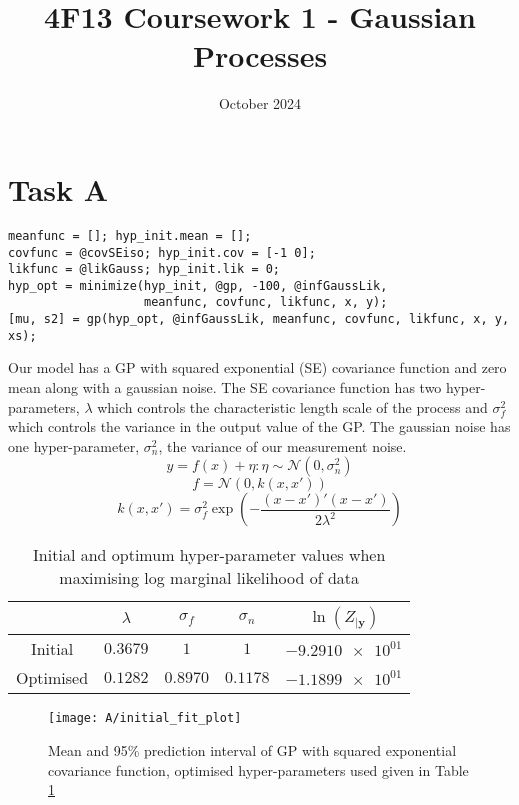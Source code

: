 \documentclass[11pt]{article}
\title{\vspace{-2cm}4F13 Coursework 1 - Gaussian Processes}
\author{}
\date{October 2024}
\begin{document}
\maketitle
\section{Task A}

\begin{lstlisting}[caption=Code to train hyper-parameters and generate the predictive distribution of a GP with squared exponential covariance, captionpos=b, basicstyle=\small]
meanfunc = []; hyp_init.mean = [];
covfunc = @covSEiso; hyp_init.cov = [-1 0];
likfunc = @likGauss; hyp_init.lik = 0;
hyp_opt = minimize(hyp_init, @gp, -100, @infGaussLik, 
                   meanfunc, covfunc, likfunc, x, y);
[mu, s2] = gp(hyp_opt, @infGaussLik, meanfunc, covfunc, likfunc, x, y, xs);
\end{lstlisting}
\label{lst:A}

Our model has a GP with squared exponential (SE) covariance function and zero mean along with a gaussian noise. The SE covariance function has two hyper-parameters, $\lambda$ which controls the characteristic length scale of the process and $\sigma_f^2$ which controls the variance in the output value of the GP. The gaussian noise has one hyper-parameter, $\sigma_n^2$, the variance of our measurement noise. 
\[y = f(x) + \eta : \eta \sim \mathcal{N}(0, \sigma_n^2)\]
\[f = \mathcal{N}(0, k(x, x'))\]
\[k(x,x') = \sigma_f^2 \exp(-\frac{(x-x')'(x-x')}{2\lambda^2})\]

\begin{table}[h]
    \centering
    \begin{tabular}{|c|c|c|c|c|}
        \hline
         & $\lambda$ & $\sigma_f$ & $\sigma_n$ & $\ln(Z_{|\textbf{y}})$ \\
        \hline
        Initial & $0.3679$ & $1$ & $1$ & $\num{-9.2910e+01}$ \\ 
        Optimised & $0.1282$ & $0.8970$ & $0.1178$ & $\num{-1.1899e+01}$ \\ 
        \hline
    \end{tabular}
    \caption{Initial and optimum hyper-parameter values when maximising log marginal likelihood of data}
    \label{table:A_hyper_parameters}
\end{table}

\begin{figure}[h]
    \centering
    \texttt{[image: A/initial\_fit\_plot]}
    \caption{Mean and 95\% prediction interval of GP with squared exponential covariance function, optimised hyper-parameters used given in Table \ref{table:A_hyper_parameters}}
    \label{fig:A}
\end{figure}
\end{document}
